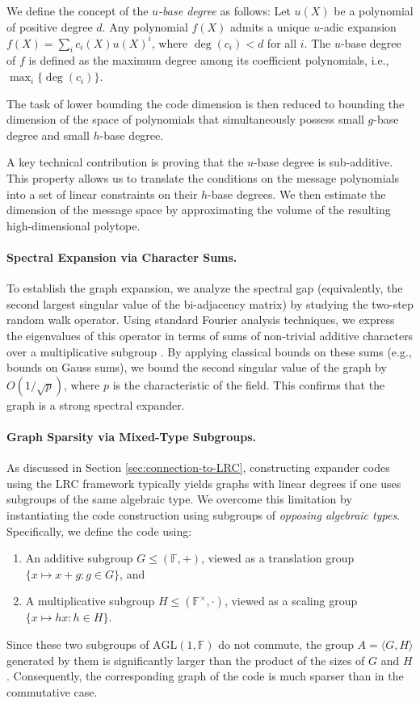 \documentclass[11pt]{article}
\theoremstyle{plain}
\theoremstyle{definition}
\begin{document}
We define the concept of the \emph{$u$-base degree} as follows: Let $u(X)$ be a polynomial of positive degree $d$. Any polynomial $f(X)$ admits a unique $u$-adic expansion $f(X)=\sum_i c_i(X)u(X)^i$, where $\deg(c_i) < d$ for all $i$. The $u$-base degree of $f$ is defined as the maximum degree among its coefficient polynomials, i.e., $\max_i \{\deg(c_i)\}$.

The task of lower bounding the code dimension is then reduced to bounding the dimension of the space of polynomials that simultaneously possess small $g$-base degree and small $h$-base degree.

A key technical contribution is proving that the $u$-base degree is sub-additive. This property allows us to translate the conditions on the message polynomials into a set of linear constraints on their $h$-base degrees. We then estimate the dimension of the message space by approximating the volume of the resulting high-dimensional polytope.
\paragraph{Spectral 
Expansion via Character Sums.}
To establish the graph expansion, we analyze the spectral gap (equivalently, the second largest singular value of the bi-adjacency matrix) by studying the two-step random walk operator. Using standard Fourier analysis techniques, we express the eigenvalues of this operator in terms of sums of non-trivial additive characters over a multiplicative subgroup \cite{alon2014additive}. By applying classical bounds on these sums (e.g., bounds on Gauss sums), we bound the second singular value of the graph by $O(1/\sqrt{p})$, where $p$ is the characteristic of the field. This confirms that the graph is a strong spectral expander.



\paragraph{Graph Sparsity via Mixed-Type Subgroups.}
As discussed in Section \ref{sec:connection-to-LRC}, constructing expander codes using the LRC framework typically yields graphs with linear degrees if one uses subgroups of the same algebraic type. We overcome this limitation by instantiating the code construction using subgroups of \emph{opposing algebraic types}. Specifically, we define the code using:
\begin{enumerate}
    \item An additive subgroup $G\leq (\mathbb{F},+)$, viewed as a translation group $\{x \mapsto x+g : g\in G\}$, and
    \item A multiplicative subgroup $H\leq (\mathbb{F}^{\times},\cdot)$, viewed as a scaling group $\{x \mapsto hx : h\in H\}$.
\end{enumerate}
Since these two subgroups of $\mathrm{AGL}(1,\mathbb{F})$ do not commute, the group $A = \langle G, H \rangle$ generated by them is significantly larger than the product of the sizes of $G$ and $H$. Consequently, the corresponding graph of the code is much sparser than in the commutative case.
\end{document}
